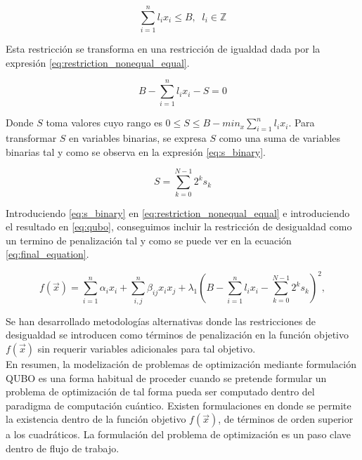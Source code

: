 \begin{equation}
    \sum_{i=1}^nl_ix_i \leq B, \; \; l_i \in \mathbb{Z}
    \label{eq:restriction_inequality}
\end{equation}

Esta restricción se transforma en una restricción de igualdad dada por la expresión \ref{eq:restriction_nonequal_equal}.

\begin{equation}
    B - \sum_{i=1}^n l_ix_i - S = 0
    \label{eq:restriction_nonequal_equal}
\end{equation}

Donde $S$ toma valores cuyo rango es $0 \leq S \leq B - min_x \sum_{i=1}^n l_ix_i$. Para transformar $S$ en variables binarias, se expresa $S$ como una suma de variables binarias tal y como se observa en la expresión \ref{eq:s_binary}.

\begin{equation}
    S = \sum_{k=0}^{N-1}2^ks_k
    \label{eq:s_binary}
\end{equation}

Introduciendo \ref{eq:s_binary} en  \ref{eq:restriction_nonequal_equal} e introduciendo el resultado en \ref{eq:qubo}, conseguimos incluir la restricción de desigualdad como un termino de penalización tal y como se puede ver en la ecuación  \ref{eq:final_equation}.

\begin{equation}
    f(\Vec{x}) = \sum_{i=1}^{n} \alpha_{i} x_{i} + \sum_{i,j}^{n} \beta_{ij} x_{i} x_{j} + \lambda_1 (B - \sum_{i=1}^n l_ix_i - \sum_{k=0}^{N-1}2^ks_k)^2,
    \label{eq:final_equation}
\end{equation}

Se han desarrollado metodologías alternativas \citep{montañez23} donde las restricciones de desigualdad se introducen como términos de penalización en la función objetivo $f(\Vec{x})$ sin requerir variables adicionales para tal objetivo. \\

En resumen, la modelización de problemas de optimización mediante formulación \mbox{QUBO} es una forma habitual de proceder cuando se pretende formular un problema de optimización de tal forma pueda ser computado dentro del paradigma de computación cuántico. Existen formulaciones en donde se permite la existencia dentro de la función objetivo $f(\Vec{x})$, de términos de orden superior a los cuadráticos. La formulación del problema de optimización es un paso clave dentro de flujo de trabajo.

